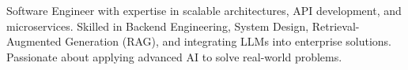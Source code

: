 

\begin{cvparagraph}



Software Engineer with expertise in scalable architectures, API development, and microservices.
Skilled in Backend Engineering, System Design, Retrieval-Augmented Generation (RAG), and integrating LLMs into enterprise solutions.
Passionate about applying advanced AI to solve real-world problems.
\end{cvparagraph}






